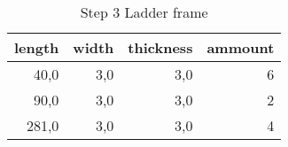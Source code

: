 \begin{table}[h!]
\centering
\caption{Step 3 Ladder frame}
\begin{tabular}{rrrr}
\toprule
 length &  width &  thickness &  ammount \\
\midrule
   40,0 &    3,0 &        3,0 &        6 \\
   90,0 &    3,0 &        3,0 &        2 \\
  281,0 &    3,0 &        3,0 &        4 \\
\bottomrule
\end{tabular}
\end{table}
